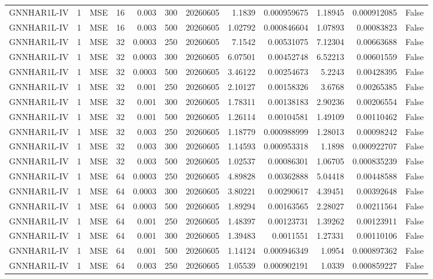 \begin{tabular}{lrlrrrrrrrrr}
GNNHAR1L-IV & 1 & MSE & 16 & 0.003 & 300 & 20260605 & 1.1839 & 0.000959675 & 1.18945 & 0.000912085 & False \\
GNNHAR1L-IV & 1 & MSE & 16 & 0.003 & 500 & 20260605 & 1.02792 & 0.000846604 & 1.07893 & 0.00083823 & False \\
GNNHAR1L-IV & 1 & MSE & 32 & 0.0003 & 250 & 20260605 & 7.1542 & 0.00531075 & 7.12304 & 0.00663688 & False \\
GNNHAR1L-IV & 1 & MSE & 32 & 0.0003 & 300 & 20260605 & 6.07501 & 0.00452748 & 6.52213 & 0.00601559 & False \\
GNNHAR1L-IV & 1 & MSE & 32 & 0.0003 & 500 & 20260605 & 3.46122 & 0.00254673 & 5.2243 & 0.00428395 & False \\
GNNHAR1L-IV & 1 & MSE & 32 & 0.001 & 250 & 20260605 & 2.10127 & 0.00158326 & 3.6768 & 0.00265385 & False \\
GNNHAR1L-IV & 1 & MSE & 32 & 0.001 & 300 & 20260605 & 1.78311 & 0.00138183 & 2.90236 & 0.00206554 & False \\
GNNHAR1L-IV & 1 & MSE & 32 & 0.001 & 500 & 20260605 & 1.26114 & 0.00104581 & 1.49109 & 0.00110462 & False \\
GNNHAR1L-IV & 1 & MSE & 32 & 0.003 & 250 & 20260605 & 1.18779 & 0.000988999 & 1.28013 & 0.00098242 & False \\
GNNHAR1L-IV & 1 & MSE & 32 & 0.003 & 300 & 20260605 & 1.14593 & 0.000953318 & 1.1898 & 0.000922707 & False \\
GNNHAR1L-IV & 1 & MSE & 32 & 0.003 & 500 & 20260605 & 1.02537 & 0.00086301 & 1.06705 & 0.000835239 & False \\
GNNHAR1L-IV & 1 & MSE & 64 & 0.0003 & 250 & 20260605 & 4.89828 & 0.00362888 & 5.04418 & 0.00448588 & False \\
GNNHAR1L-IV & 1 & MSE & 64 & 0.0003 & 300 & 20260605 & 3.80221 & 0.00290617 & 4.39451 & 0.00392648 & False \\
GNNHAR1L-IV & 1 & MSE & 64 & 0.0003 & 500 & 20260605 & 1.89294 & 0.00163565 & 2.28027 & 0.00211564 & False \\
GNNHAR1L-IV & 1 & MSE & 64 & 0.001 & 250 & 20260605 & 1.48397 & 0.00123731 & 1.39262 & 0.00123911 & False \\
GNNHAR1L-IV & 1 & MSE & 64 & 0.001 & 300 & 20260605 & 1.39483 & 0.0011551 & 1.27331 & 0.00110106 & False \\
GNNHAR1L-IV & 1 & MSE & 64 & 0.001 & 500 & 20260605 & 1.14124 & 0.000946349 & 1.0954 & 0.000897362 & False \\
GNNHAR1L-IV & 1 & MSE & 64 & 0.003 & 250 & 20260605 & 1.05539 & 0.000902191 & 1.0339 & 0.000859227 & False \\

\end{tabular}
